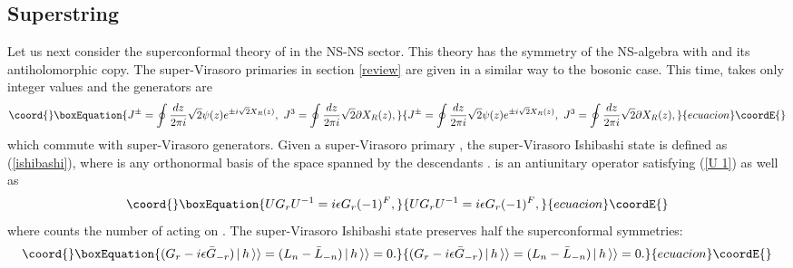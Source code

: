 \documentclass[a4paper,12pt]{article} \textheight=8.5truein
\providecommand{\ket}[1]{\left|\, #1\,\right\rangle}
\begin{document}
\subsection{Superstring}
Let us next consider the superconformal theory of \coordHE{} in
the NS-NS sector.  This theory has the symmetry of the NS-algebra
with \coordHE{} and its antiholomorphic copy. The super-Virasoro
primaries \coordHE{} in section \ref{review} are given in a
similar way to the bosonic case.  This time, \coordHE{} takes only
integer values and the \coordHE{} generators are
\begin{equation}\coord{}\boxEquation{
    J^\pm =\oint \frac{dz}{2\pi i}\sqrt{2}\psi(z)e^{\pm
    i\sqrt{2}X_R(z)},\ J^3=\oint \frac{dz}{2\pi i} \sqrt{2}
    \partial X_R(z),
}{
    J^\pm =\oint \frac{dz}{2\pi i}\sqrt{2}\psi(z)e^{\pm
    i\sqrt{2}X_R(z)},\ J^3=\oint \frac{dz}{2\pi i} \sqrt{2}
    \partial X_R(z),
}{ecuacion}\coordE{}\end{equation}
which commute with super-Virasoro generators.  Given a
super-Virasoro primary \coordHE{}, the super-Virasoro Ishibashi
state \coordHE{} is defined as (\ref{ishibashi}), where
\myHighlight{$\{ \ket{n}\}$}\coordHE{} is any orthonormal basis of the space spanned by
the descendants \myHighlight{$L_{-n_1}\cdots L_{-n_p} G_{-r_1}\cdots
G_{-r_q}\ket{h}$}\coordHE{}. \coordHE{} is an antiunitary operator satisfying
(\ref{U 1}) as well as
\begin{equation}\coord{}\boxEquation{\label{U 2}
    U G_r U^{-1} = i\epsilon G_r (-1)^F,
}{U G_r U^{-1} = i\epsilon G_r (-1)^F,
}{ecuacion}\coordE{}\end{equation}
where \coordHE{} counts the number of \coordHE{} acting on \myHighlight{$\ket{h}$}\coordHE{}
\cite{Ishibashi:1988kg}. The super-Virasoro Ishibashi state
preserves half the superconformal symmetries:
\begin{equation}\coord{}\boxEquation{\label{gluing2}
    (G_r-i\epsilon\bar{G}_{-r})\ket{h}\rangle
    =(L_n-\bar{L}_{-n})\ket{h}\rangle=0.
}{(G_r-i\epsilon\bar{G}_{-r})\ket{h}\rangle
    =(L_n-\bar{L}_{-n})\ket{h}\rangle=0.
}{ecuacion}\coordE{}\end{equation}
\end{document}
